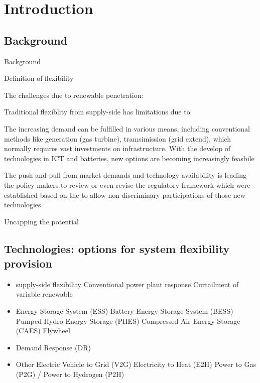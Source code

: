 \chapter{Introduction}
%
\section{Background}

Background

Definition of flexibility

The challenges due to renewable penetration:

Traditional flexiblity from supply-side has limitations due to %

The increasing demand can be fulfilled in various means, including conventional methods like generation (gas turbine), tramsimission (grid extend), which normally requires vast investments on infrastructure. With the develop of technologies in ICT and batteries, new options are becoming increasingly feasbile %

The push and pull from market demands and technology availability is leading the policy makers to review or even revise the regulatory framework which were established based on the  to allow non-discriminary participations of those new technologies. %

Uncapping the potential

\section{Technologies: options for system flexibility provision}

\begin{itemize}
	\item supply-side flexibility
	\subitem Conventional power plant response
	\subitem Curtailment of variable renewable
	\item Energy Storage System (ESS)
	\subitem Battery Energy Storage System (BESS)
	\subitem Pumped Hydro Energy Storage (PHES)
	\subitem Compressed Air Energy Storage (CAES)
	\subitem Flywheel
	\item Demand Response (DR)
	\item Other
	\subitem Electric Vehicle to Grid (V2G)
	\subitem Electricity to Heat (E2H)
	\subitem Power to Gas (P2G) / Power to Hydrogen (P2H)
\end{itemize}

